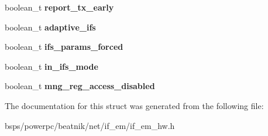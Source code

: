 \begin{DoxyCompactItemize}
\mbox{\label{structem__hw_a6a8c1f2319cd7dfb2db516bc94b6f3aa}} 
boolean\+\_\+t {\bfseries report\+\_\+tx\+\_\+early}
\item 
\mbox{\label{structem__hw_a58dd240f270af16695a1d68c1ff9d950}} 
boolean\+\_\+t {\bfseries adaptive\+\_\+ifs}
\item 
\mbox{\label{structem__hw_ae2c0e3a5587203d19951c168c563b55f}} 
boolean\+\_\+t {\bfseries ifs\+\_\+params\+\_\+forced}
\item 
\mbox{\label{structem__hw_a683cfd504ad0387ccbec0a9fdb2274e0}} 
boolean\+\_\+t {\bfseries in\+\_\+ifs\+\_\+mode}
\item 
\mbox{\label{structem__hw_af6e6ea3c99a948212480899cccfe7f78}} 
boolean\+\_\+t {\bfseries mng\+\_\+reg\+\_\+access\+\_\+disabled}
\end{DoxyCompactItemize}


The documentation for this struct was generated from the following file\+:\begin{DoxyCompactItemize}
\item 
bsps/powerpc/beatnik/net/if\+\_\+em/if\+\_\+em\+\_\+hw.\+h\end{DoxyCompactItemize}

